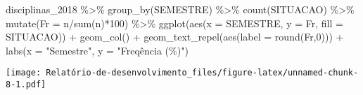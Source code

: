 \documentclass[
]{article}
\newenvironment{Shaded}{\begin{snugshade}}{\end{snugshade}}
\newcommand{\AttributeTok}[1]{\textcolor[rgb]{0.77,0.63,0.00}{#1}}
\newcommand{\DecValTok}[1]{\textcolor[rgb]{0.00,0.00,0.81}{#1}}
\newcommand{\FunctionTok}[1]{\textcolor[rgb]{0.00,0.00,0.00}{#1}}
\newcommand{\NormalTok}[1]{#1}
\newcommand{\SpecialCharTok}[1]{\textcolor[rgb]{0.00,0.00,0.00}{#1}}
\newcommand{\StringTok}[1]{\textcolor[rgb]{0.31,0.60,0.02}{#1}}
\begin{document}
\begin{Shaded}
\begin{Highlighting}[]
\NormalTok{disciplinas\_2018 }\SpecialCharTok{\%\textgreater{}\%}  
  \FunctionTok{group\_by}\NormalTok{(SEMESTRE) }\SpecialCharTok{\%\textgreater{}\%} 
  \FunctionTok{count}\NormalTok{(SITUACAO) }\SpecialCharTok{\%\textgreater{}\%} 
  \FunctionTok{mutate}\NormalTok{(}\AttributeTok{Fr =}\NormalTok{ n}\SpecialCharTok{/}\FunctionTok{sum}\NormalTok{(n)}\SpecialCharTok{*}\DecValTok{100}\NormalTok{) }\SpecialCharTok{\%\textgreater{}\%}
  \FunctionTok{ggplot}\NormalTok{(}\FunctionTok{aes}\NormalTok{(}\AttributeTok{x =}\NormalTok{ SEMESTRE, }\AttributeTok{y =}\NormalTok{ Fr, }\AttributeTok{fill =}\NormalTok{ SITUACAO)) }\SpecialCharTok{+}
  \FunctionTok{geom\_col}\NormalTok{() }\SpecialCharTok{+}
  \FunctionTok{geom\_text\_repel}\NormalTok{(}\FunctionTok{aes}\NormalTok{(}\AttributeTok{label =} \FunctionTok{round}\NormalTok{(Fr,}\DecValTok{0}\NormalTok{))) }\SpecialCharTok{+}
  \FunctionTok{labs}\NormalTok{(}\AttributeTok{x =} \StringTok{"Semestre"}\NormalTok{, }\AttributeTok{y =} \StringTok{"Freqência (\%)"}\NormalTok{)}
\end{Highlighting}
\end{Shaded}

\texttt{[image: Relatório-de-desenvolvimento\_files/figure-latex/unnamed-chunk-8-1.pdf]}
\end{document}
